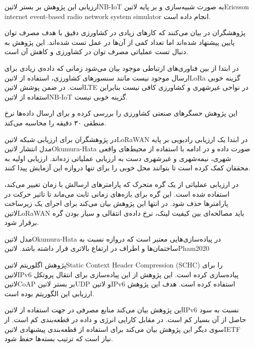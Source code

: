 ارزیابی این پژوهش بر بستر ‌لاتین{NB-IoT} به صورت شبیه‌سازی و بر پایه ‌لاتین{Ericsson internet event-based radio network system simulator} انجام داده است.


پژوهشگران در  بیان می‌کنند که کارهای زیادی در کشاورزی دقیق با هدف مصرف توان پایین پیشنهاد شده‌اند اما تعداد کمی از آن‌ها در عمل تست شده‌اند.
این پژوهش به دنبال تست عملیاتی مصرف توان در کشاورزی و کاهش آن است.

در ابتدا از بین فناوری‌های ارتباطی موجود بیان می‌شود زمانی که داده‌ی زیادی برای ارسال موجود نیست مانند سنسورهای کشاورزی، استفاده از ‌لاتین{LoRa} گزینه خوبی است.
در ضمن پوشش ‌لاتین{LTE} در نواحی غیرشهری و کشاورزی کافی نیست بنابراین استفاده از ‌لاتین{NB-IoT} گزینه خوبی نیست.

این پژوهش حسگرهای صنعتی کشاورزی را بررسی کرده و برای ارسال داده‌ها نرخ منطقی ۳۰ دقیقه را محاسبه می‌کند.


در  پژوهشگران برای ارزیابی شبکه ‌لاتین{LoRaWAN} در ابتدا یک ارزیابی رادیویی بر پایه مدل انتشار ‌لاتین{Okumura-Hata} صورت داده
و در ادامه با استفاده از محیط‌های واقعی شهری، نیمه‌شهری و غیرشهری دست به ارزیابی عملیاتی زده‌اند. ارزیابی اولیه به محققان کمک کرده است تا بتوانند محل خوبی را برای
تنها دروازه این آزمایش پیدا کنند.

در ارزیابی عملیاتی از یک گره متحرک که پارامترهای ارسالش با زمان تغییر می‌کند، استفاده شده است. این گره برای بازه‌های زمانی ثابت می‌ماند تا تاثیر حرکت در پارامترها حذف شود.
در انتها این پژوهش بیان می‌کند برای اجرای یک زیرساخت ‌لاتین{LoRaWAN} باید مصالحه‌ای بین کیفیت لینک، نرخ داده‌ی انتقالی و سیار بودن گره برقرار شود.

مدل ‌لاتین{Okumura-Hata} در پیاده‌سازی‌هایی معتبر است که دروازه نسبت به ساختمان‌ها و اطراف در ارتفاع بالاتری قرار داشته باشد.
‌لاتین{Pham2020}


پژوهش 
اگلوریتم ‌لاتین{Static Context Header Compression (SCHC)} را برای ‌لاتین{IPv6} پیاده‌سازی کرده است.
این پژوهش از این پیاده‌سازی برای انتقال پروتکل ‌لاتین{CoAP} بر بستر ‌لاتین{UDP} و ‌لاتین{IPv6} استفاده کرده است.
هدف این پژوهش ارزیابی این الگوریتم بوده است.

این پژوهش بیان می‌کند منابع مصرفی در جهت استفاده از ‌لاتین{IPv6} نسبت به سود حاصل از آن بسیار کم است. در مقابل کارایی انرژی و داده در قطعه‌بندی کم است.
از سوی دیگر این پژوهش بیان می‌کند برای استفاده از قطعه‌بندی پیشنهادی ‌لاتین{IETF} نیاز است که ترتیب بسته‌ها حفظ شود.

